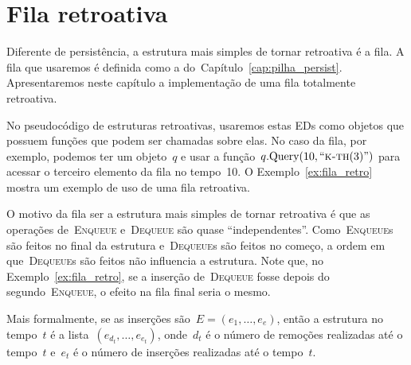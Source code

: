 \documentclass[main.tex]{subfiles}
\begin{document}
\chapter{Fila retroativa}

Diferente de persistência, a estrutura mais simples de tornar retroativa é a fila. A fila que usaremos é definida como a do~Capítulo~\ref{cap:pilha_persist}. Apresentaremos neste capítulo a implementação de uma fila totalmente retroativa.

No pseudocódigo de estruturas retroativas, usaremos estas EDs como objetos que possuem funções que podem ser chamadas sobre elas. No caso da fila, por exemplo, podemos ter um objeto~$q$ e usar a função~$q.\text{Query}(10, ``\textsc{k-th}(3)")$ para acessar o terceiro elemento da fila no tempo~10. O Exemplo~\ref{ex:fila_retro} mostra um exemplo de uso de uma fila retroativa.

O motivo da fila ser a estrutura mais simples de tornar retroativa é que as operações de~\textsc{Enqueue} e~\textsc{Dequeue} são quase ``independentes''. Como~\textsc{Enqueue}s são feitos no final da estrutura e~\textsc{Dequeue}s são feitos no começo, a ordem em que~\textsc{Dequeue}s são feitos não influencia a estrutura. Note que, no Exemplo~\ref{ex:fila_retro}, se a inserção de~\textsc{Dequeue} fosse depois do segundo~\textsc{Enqueue}, o efeito na fila final seria o mesmo.

Mais formalmente, se as inserções são~$E = (e_1, \ldots, e_e)$, então a estrutura no tempo~$t$ é a lista~$(e_{d_t}, \ldots, e_{e_t})$, onde~$d_t$ é o número de remoções realizadas até o tempo~$t$ e~$e_t$ é o número de inserções realizadas até o tempo~$t$.
\end{document}
